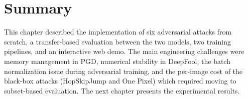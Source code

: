 \section{Summary}

This chapter described the implementation of six adversarial attacks from scratch, a transfer-based evaluation between the two models, two training pipelines, and an interactive web demo. The main engineering challenges were memory management in PGD, numerical stability in DeepFool, the batch normalization issue during adversarial training, and the per-image cost of the black-box attacks (HopSkipJump and One Pixel) which required moving to subset-based evaluation. The next chapter presents the experimental results.


